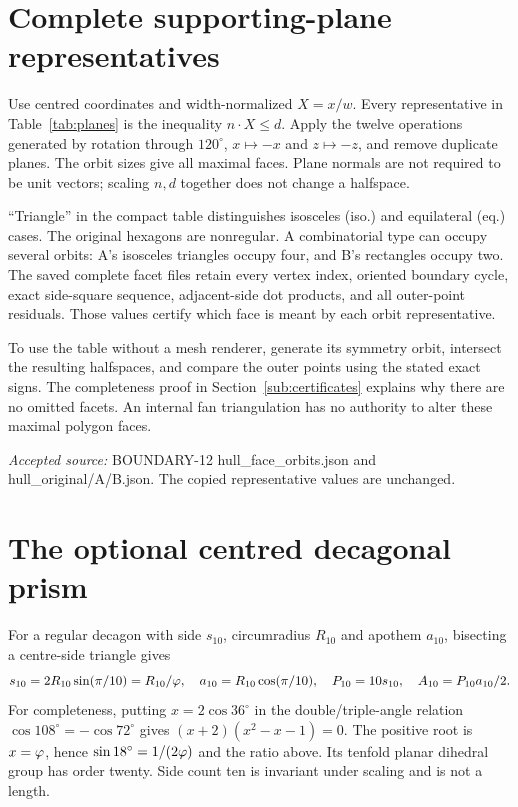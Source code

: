 \documentclass[11pt,a4paper]{article}
\newcommand{\source}[1]{\par{\small\emph{Accepted source:} #1}\par}
\begin{document}
\clearpage\section{Complete supporting-plane representatives}\label{app:planes}
Use centred coordinates and width-normalized $X=x/w$. Every representative in Table~\ref{tab:planes} is the inequality $n\cdot X\leq d$. Apply the twelve operations generated by rotation through $120^\circ$, $x\mapsto-x$ and $z\mapsto-z$, and remove duplicate planes. The orbit sizes give all maximal faces. Plane normals are not required to be unit vectors; scaling $n,d$ together does not change a halfspace.

``Triangle'' in the compact table distinguishes isosceles (iso.) and equilateral (eq.) cases. The original hexagons are nonregular. A combinatorial type can occupy several orbits: A's isosceles triangles occupy four, and B's rectangles occupy two. The saved complete facet files retain every vertex index, oriented boundary cycle, exact side-square sequence, adjacent-side dot products, and all outer-point residuals. Those values certify which face is meant by each orbit representative.

To use the table without a mesh renderer, generate its symmetry orbit, intersect the resulting halfspaces, and compare the outer points using the stated exact signs. The completeness proof in Section~\ref{sub:certificates} explains why there are no omitted facets. An internal fan triangulation has no authority to alter these maximal polygon faces.
\source{BOUNDARY-12 hull\_face\_orbits.json and hull\_original/A/B.json. The copied representative values are unchanged.}

\clearpage\section{The optional centred decagonal prism}\label{app:decagon}
For a regular decagon with side $s_{10}$, circumradius $R_{10}$ and apothem $a_{10}$, bisecting a centre-side triangle gives
\begin{equation}\label{eq:decagon}
s_{10}=2R_{10}\sin(\pi/10)=R_{10}/\varphi,
\quad a_{10}=R_{10}\cos(\pi/10),\quad
P_{10}=10s_{10},\quad A_{10}=P_{10}a_{10}/2.
\end{equation}
For completeness, putting $x=2\cos36^\circ$ in the double/triple-angle relation $\cos108^\circ=-\cos72^\circ$ gives $(x+2)(x^2-x-1)=0$. The positive root is $x=\varphi$, hence $\sin18^\circ=1/(2\varphi)$ and the ratio above. Its tenfold planar dihedral group has order twenty. Side count ten is invariant under scaling and is not a length.
\end{document}
